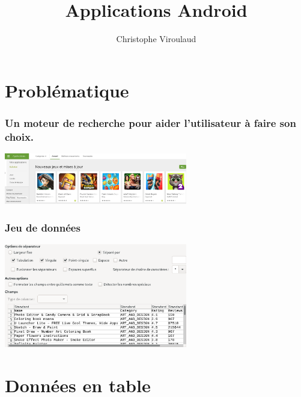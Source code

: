 \documentclass[svgnames,11pt]{beamer}
\author[]{Christophe Viroulaud}
\title{Applications Android}
\date{}
\institute{Première NSI}
\begin{document}
\begin{frame}
    \titlepage
\end{frame}

\section{Problématique}
\begin{frame}
    \frametitle{Un moteur de recherche pour aider l'utilisateur à faire son choix.}
    \begin{center}
        \centering
        \includegraphics[width=8cm]{ressources/playstore.png}
        \label{IMG}
    \end{center}

\end{frame}

\begin{frame}
    \frametitle{Jeu de données}
    \begin{center}
        \centering
        \includegraphics[width=8cm]{ressources/jeu-donnees.png}
        \label{IMG}
    \end{center}
    \begin{center}
    \end{center}

\end{frame}
\section{Données en table}
\end{document}
